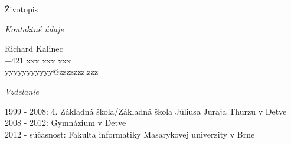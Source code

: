 \documentclass{article}
\begin{document}
\begin{center}
Životopis
\end{center}	
\begin{flushleft}
\bigskip

\Large
\textit{\textsf{Kontaktné údaje\\}}
\normalsize

\smallskip

Richard Kalinec\\
+421 xxx xxx xxx\\
yyyyyyyyyyy@zzzzzzz.zzz\\

\bigskip

\Large
\textit{\textsf{Vzdelanie\\}}
\normalsize

\smallskip

1999 - 2008: 4. Základná škola/Základná škola Júliusa Juraja Thurzu v Detve\\
2008 - 2012: Gymnázium v Detve\\
2012 - súčasnosť: Fakulta informatiky Masarykovej univerzity v Brne\\
\end{flushleft}
\end{document}
